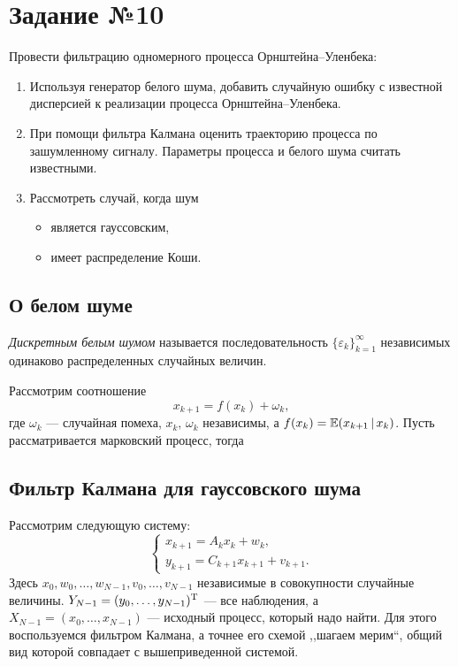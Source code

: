 \section{Задание №10}

Провести фильтрацию одномерного процесса Орнштейна--Уленбека:
\begin{enumerate}
        \item Используя генератор белого шума, добавить случайную ошибку с известной дисперсией к реализации процесса Орнштейна--Уленбека.
        \item При помощи фильтра Калмана оценить траекторию процесса по зашумленному сигналу. Параметры процесса и белого шума считать известными.
        \item Рассмотреть случай, когда шум 
        \begin{itemize}
                \item является гауссовским,
                \item имеет распределение Коши.
        \end{itemize}
\end{enumerate}


\subsection{О белом шуме}

\begin{definition}
        \textit{Дискретным белым шумом} называется последовательность $\{\varepsilon_k\}_{k=1}^{\infty}$ независимых одинаково распределенных случайных величин.
\end{definition}

Рассмотрим соотношение
$$
        x_{k+1} = f(x_k) + \omega_k,
$$
где $\omega_k$ --- случайная помеха, $x_k,\,\omega_k$ независимы, а $f(x_k) = \mathbb{E}(x_{k+1}\,|\,x_{k})$. Пусть рассматривается марковский процесс, тогда 


\subsection{Фильтр Калмана для гауссовского шума}

Рассмотрим следующую систему:
$$
        \begin{cases}
x_{k+1} = A_k x_k + w_k, \\
y_{k+1} = C_{k+1}x_{k+1} + v_{k+1}.
        \end{cases}
$$
Здесь $x_0, w_0, \ldots, w_{N-1}, v_0,\ldots,v_{N-1}$ независимые в совокупности случайные величины. $Y_{N-1} = (y_0,\ldots,y_{N-1})^{\mathrm{T}}$ --- все наблюдения, а $X_{N-1} = (x_0,\ldots,x_{N-1})$ --- исходный процесс, который надо найти. Для этого воспользуемся фильтром Калмана, а точнее его схемой ,,шагаем мерим``, общий вид которой совпадает с вышеприведенной системой.

